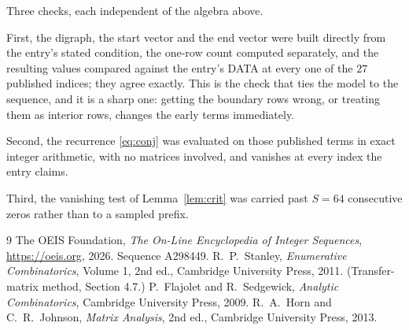 \documentclass[11pt,a4paper]{article}
\theoremstyle{plain}
\theoremstyle{definition}
\begin{document}
Three checks, each independent of the algebra above.

First, the digraph, the start vector and the end vector were built directly from the
entry's stated condition, the one-row count computed separately, and the resulting values
compared against the entry's DATA at every one of the $27$ published indices; they
agree exactly. This is the check that ties the model to the sequence, and it is a sharp one:
getting the boundary rows wrong, or treating them as interior rows, changes the early terms
immediately.

Second, the recurrence \eqref{eq:conj} was evaluated on those published terms in exact
integer arithmetic, with no matrices involved, and vanishes at every index the entry claims.

Third, the vanishing test of Lemma~\ref{lem:crit} was carried past $S=64$ consecutive
zeros rather than to a sampled prefix.

\begin{thebibliography}{9}
 The OEIS Foundation, \emph{The On-Line Encyclopedia of Integer
Sequences}, \url{https://oeis.org}, 2026. Sequence A298449.
 R.~P.~Stanley, \emph{Enumerative Combinatorics}, Volume 1, 2nd ed.,
Cambridge University Press, 2011. (Transfer-matrix method, Section 4.7.)
 P.~Flajolet and R.~Sedgewick, \emph{Analytic Combinatorics}, Cambridge
University Press, 2009.
 R.~A.~Horn and C.~R.~Johnson, \emph{Matrix Analysis}, 2nd ed., Cambridge
University Press, 2013.
\end{thebibliography}
\end{document}
